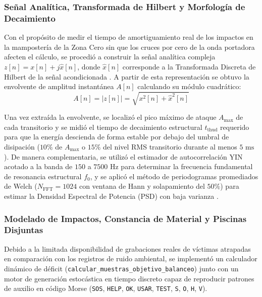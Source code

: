 \documentclass[11pt, a4paper]{article}
\begin{document}
\subsubsection{Señal Analítica, Transformada de Hilbert y Morfología de Decaimiento}
Con el propósito de medir el tiempo de amortiguamiento real de los impactos en la mampostería de la Zona Cero sin que los cruces por cero de la onda portadora afecten el cálculo, se procedió a construir la señal analítica compleja $z[n] = x[n] + j\hat{x}[n]$, donde $\hat{x}[n]$ corresponde a la Transformada Discreta de Hilbert de la señal acondicionada \cite{Oppenheim}. A partir de esta representación se obtuvo la envolvente de amplitud instantánea $A[n]$ calculando su módulo cuadrático:
\begin{equation}
    A[n] = |z[n]| = \sqrt{x^2[n] + \hat{x}^2[n]}
\end{equation}

Una vez extraída la envolvente, se localizó el pico máximo de ataque $A_{\max}$ de cada transitorio y se midió el tiempo de decaimiento estructural $t_{\text{thud}}$ requerido para que la energía descienda de forma estable por debajo del umbral de disipación ($10\%$ de $A_{\max}$ o $15\%$ del nivel RMS transitorio durante al menos $5\text{ ms}$). De manera complementaria, se utilizó el estimador de autocorrelación YIN acotado a la banda de $150$ a $7500\text{ Hz}$ para determinar la frecuencia fundamental de resonancia estructural $f_0$, y se aplicó el método de periodogramas promediados de Welch ($N_{\text{FFT}} = 1024$ con ventana de Hann y solapamiento del $50\%$) para estimar la Densidad Espectral de Potencia (PSD) con baja varianza \cite{Proakis}.

\subsubsection{Modelado de Impactos, Constancia de Material y Piscinas Disjuntas}
Debido a la limitada disponibilidad de grabaciones reales de víctimas atrapadas en comparación con los registros de ruido ambiental, se implementó un calculador dinámico de déficit (\texttt{calcular\_muestras\_objetivo\_balanceo}) junto con un motor de generación estocástica en tiempo discreto capaz de reproducir patrones de auxilio en código Morse (\texttt{SOS}, \texttt{HELP}, \texttt{OK}, \texttt{USAR}, \texttt{TEST}, \texttt{S}, \texttt{O}, \texttt{H}, \texttt{V}).
\end{document}
